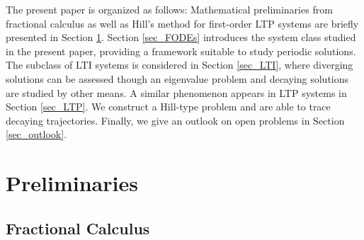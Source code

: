 \documentclass{svproc}
\begin{document}
	The present paper is organized as follows: Mathematical preliminaries from fractional calculus as well as Hill's method for first-order LTP systems are briefly presented in  Section \ref{sec_preliminaries}. Section \ref{sec_FODEs} introduces the system class studied in the present paper, providing a framework suitable to study periodic solutions. The subclass of LTI systems is considered in Section \ref{sec_LTI}, where diverging solutions can be assessed though an eigenvalue problem and decaying solutions are studied by other means. A similar phenomenon appears in LTP systems in Section \ref{sec_LTP}. We construct a Hill-type problem and are able to trace decaying trajectories. Finally, we give an outlook on open problems in Section \ref{sec_outlook}.
	
	\section{Preliminaries}
	\label{sec_preliminaries}
	\subsection{Fractional Calculus }%
	
\end{document}
